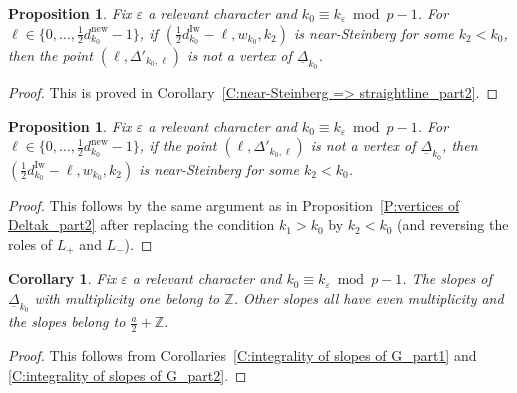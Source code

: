 \documentclass[12pt]{amsart}
\newtheorem{corollary}[subsection]{Corollary}
\newtheorem{proposition}[subsection]{Proposition}
\theoremstyle{definition}
\numberwithin{equation}{subsection}
\def\ZZ{\mathbb{Z}}
\newcommand{\new}{\mathrm{new}}
\newcommand{\Iw}{\mathrm{Iw}}
\begin{document}
\begin{proposition}
\label{P:vertices of Deltak_part3}
Fix $\varepsilon$ a relevant character and $k_0 \equiv k_\varepsilon \bmod p-1$.
For $\ell \in\{0, \dots, \frac12d_{k_0}^\new-1\}$, if $(\frac 12d_{k_0}^\Iw - \ell, w_{k_0}, k_2)$ is near-Steinberg for some $k_2 < {k_0}$, then the point $(\ell, \Delta'_{{k_0},\ell})$ is not a vertex of $\underline \Delta_{k_0}$.
\end{proposition}
\begin{proof}
This is proved in Corollary~\ref{C:near-Steinberg => straightline_part2}.
\end{proof}

\begin{proposition}
\label{P:vertices of Deltak_part4}
Fix $\varepsilon$ a relevant character and $k_0 \equiv k_\varepsilon \bmod p-1$.
For $\ell \in\{0, \dots, \frac12d_{k_0}^\new-1\}$, if the point $(\ell, \Delta'_{{k_0},\ell})$ is not a vertex of $\underline \Delta_{k_0}$, then $(\frac 12d_{k_0}^\Iw - \ell, w_{k_0}, k_2)$ is near-Steinberg for some  $k_2 < {k_0}$.
\end{proposition}
\begin{proof}
This follows by the same argument as in Proposition~\ref{P:vertices of Deltak_part2} after replacing the condition $k_1>k_0$ by $k_2<k_0$ (and reversing the roles of $L_+$ and $L_-$).
\end{proof}

\begin{corollary}
\label{C:slopes of Deltak}
Fix $\varepsilon$ a relevant character and $k_0 \equiv k_\varepsilon \bmod p-1$.
The slopes of $\underline \Delta_{k_0}$ with multiplicity one belong to $\ZZ$. Other slopes all have even multiplicity and the slopes belong to $\frac a2 + \ZZ$.
\end{corollary}
\begin{proof}
This follows from Corollaries~\ref{C:integrality of slopes of G_part1} and \ref{C:integrality of slopes of G_part2}.
\end{proof}






















\appendix
\end{document}
